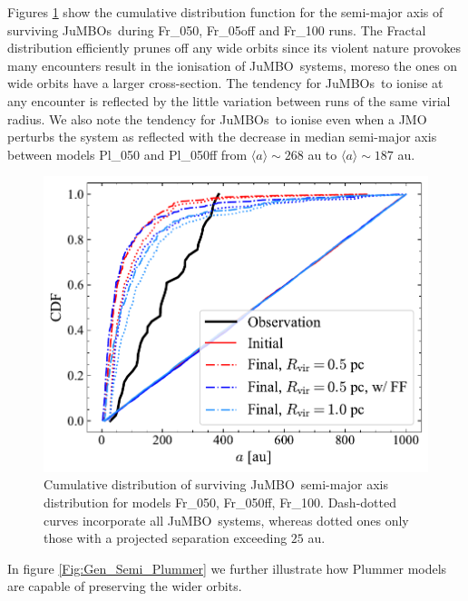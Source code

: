 \documentclass[submission,phys]{lib/SciPost}
\newcommand{\jumbo}{\mbox{JuMBO}}
\newcommand{\jumbos}{\mbox{JuMBOs}}
\begin{document}
Figures \ref{Fig:Gen_Semi_Fractal} show the cumulative distribution
function for the semi-major axis of surviving \jumbos\, during
Fr\_050, Fr\_05off and Fr\_100 runs. The Fractal distribution
efficiently prunes off any wide orbits since its violent nature
provokes many encounters result in the ionisation of \jumbo\, systems,
moreso the ones on wide orbits have a larger cross-section. The
tendency for \jumbos\, to ionise at any encounter is reflected by the
little variation between runs of the same virial radius. We also note
the tendency for \jumbos\, to ionise even when a JMO perturbs the
system as reflected with the decrease in median semi-major axis
between models Pl\_050 and Pl\_050ff from $\langle a\rangle\sim268$ au
to $\langle a\rangle\sim187$ au.
   
\begin{figure}
    \centering
        \includegraphics[width=\columnwidth]{figures/Fractal_General_sem_axis.pdf}
    \caption{Cumulative distribution of surviving \jumbo\, semi-major
      axis distribution for models Fr\_050, Fr\_050ff,
      Fr\_100. Dash-dotted curves incorporate all \jumbo\, systems,
      whereas dotted ones only those with a projected separation
      exceeding $25$ au.}
         \label{Fig:Gen_Semi_Fractal}
\end{figure}
    
In figure \ref{Fig:Gen_Semi_Plummer} we further illustrate how Plummer
models are capable of preserving the wider orbits.
   
\end{document}

